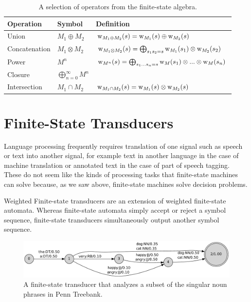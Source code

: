 \begin{table}
\begin{center}
\begin{tabular}{lll}
Operation & Symbol & Definition \\
\hline
Union & $M_1 \oplus M_2$ & $\mbox{${\rm w}$}_{M_1 \oplus M_2}(s) = \mbox{${\rm w}$}_{M_1}(s) \oplus \mbox{${\rm w}$}_{M_2}(s)$\\ 
Concatenation & $M_1 \otimes M_2$ & $\mbox{${\rm w}$}_{M_1 \otimes M_2}(s) = \bigoplus_{s_1s_2 = s} \mbox{${\rm w}$}_{M_1}(s_1) \otimes \mbox{${\rm w}$}_{M_2}(s_2)$\\
Power & $M^n$ & $\mbox{${\rm w}$}_{M^n}(s) = \bigoplus_{s_1 ... s_n = s} \mbox{${\rm w}$}_{M}(s_1) \otimes ... \otimes \mbox{${\rm w}$}_{M}(s_n)$\\ 
Closure & $\bigoplus_{n = 0}^\infty M^n$ &  \\
Intersection & $M_1 \cap M_2$ & $\mbox{${\rm w}$}_{M_1 \cap M_2}(s) = \mbox{${\rm w}$}_{M_1}(s) \otimes \mbox{${\rm w}$}_{M_2}(s)$ \\
\end{tabular}
\caption{A selection of operators from the finite-state algebra.}\label{tab:fs-algebra}
\end{center}
\end{table}


\section{Finite-State Transducers}
Language processing frequently requires translation of one signal such
as speech or text into another signal, for example text in another
language in the case of machine translation or annotated text in the
case of part of speech tagging. These do not seem like the kinds of
processing tasks that finite-state machines can solve because, as we
saw above, finite-state machines solve decision problems.

Weighted Finite-state transducers are an extension of weighted
finite-state automata. Whereas finite-state automata simply accept or
reject a symbol sequence, finite-state transducers simultaneously
output another symbol sequence.

\begin{figure}
\begin{center}
\includegraphics[scale=.5]{np_a}
\end{center}
\caption{A finite-state transducer that analyzes a subset of the singular noun phrases in Penn Treebank.}\label{fig:np-fst}
\end{figure}

